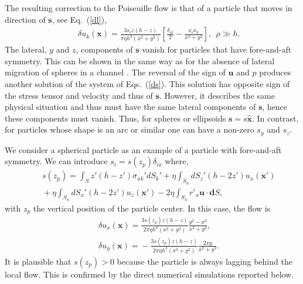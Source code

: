 The resulting correction to the Poiseuille flow is that of
a particle that moves in direction of $\bm s$, see Eq.~(\ref{dl}),
\begin{eqnarray}&&\!\!\!\!\!\!\!\!\!\!\!\!\!\!\!\!
\delta u_k(\bm x)\!=\!\frac{3s_iz(h\!-\!z)}{\pi \eta h^3(x^2+y^2)}\left[\frac{\delta_{ik}}{2}\!-\!\frac{x_ix_k}{x^2+y^2}\right],\ \ \rho\gg h. \label{stks}
\end{eqnarray}
The lateral, $y$ and $z$, components of $\bm s$ vanish for particles that have fore-and-aft symmetry. This can be shown in the same way as for the absence of lateral migration of spheres in a channel \citep{leal,1rd2}.
The reversal of the sign of $\bm u$ and $p$ produces another solution of the system of Eqs.~(\ref{ds}). This solution has opposite sign of the stress tensor and velocity and thus of $\bm s$. However, it describes
the same physical situation and thus must have the same lateral components of $\bm s$, hence these components must vanish. Thus, for spheres or ellipsoids $\bm s=s\bm {\hat x}$. In contrast, for particles whose shape
is an arc or similar one can have a non-zero $s_y$ and $s_z$.

We consider a spherical particle as an example of a particle with fore-and-aft symmetry. We can introduce $s_i=s(z_p)\delta_{ix}$ where,
\begin{eqnarray}&&\!\!\!\!\!\!
s(z_p)=\int_{S}\!\! z'(h\!-\!z') \sigma_{xk}'dS_k'+\eta\int_{S_n}dS_z' (h\!-\!2z')u_x(\bm x')\nonumber\\&&\!\!\!\!\!\!+\eta\int_{S_n}dS_x' (h\!-\!2z')u_{z}(\bm x')
-2\eta\int_{S_n}r'_x \bm u\cdot{\bm dS}, \ \
\end{eqnarray}
with $z_p$ the vertical position of the particle center. In this case, the flow is
\begin{eqnarray}&&\!\!\!\!\!\!\!\!\!\!\!\!\!\!\!\!
\delta u_x(\bm x)\!=\!\frac{3s(z_p)z(h\!-\!z)}{2\pi \eta h^3(x^2+y^2)}\frac{y^2- x^2}{x^2+y^2},\nonumber\\&&\!\!\!\!\!\!\!\!\!\!\!\!\!\!\!\!\!
\delta u_y(\bm x)\!=\!-\frac{3s(z_p)z(h\!-\!z)}{2\pi \eta h^3(x^2+y^2)}\frac{2xy}{x^2+y^2}.
\label{dist_flow}
\end{eqnarray}
It is plausible that $s(z_p)>0$ because the particle is always lagging behind the local flow. This is confirmed by the direct numerical simulations reported below.

